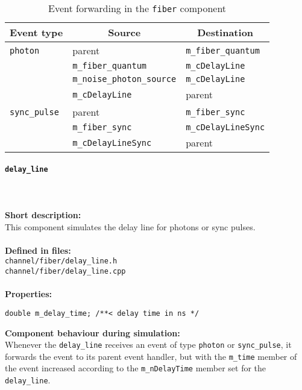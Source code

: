 \begin{table}[H]
\begin{tabular}{ | l | l || l | }
\hline
\multicolumn{1}{|c|}{\textbf{Event type}} & \multicolumn{1}{c||}{\textbf{Source}} & \multicolumn{1}{c|}{\textbf{Destination}} \\
\hline \hline
\texttt{photon} & parent & \texttt{m\_fiber\_quantum} \\
\cline{2-3}
 & \texttt{m\_fiber\_quantum} & \texttt{m\_cDelayLine} \\
\cline{2-3}
 & \texttt{m\_noise\_photon\_source} & \texttt{m\_cDelayLine} \\
\cline{2-3}
 & \texttt{m\_cDelayLine} & parent \\
\hline
\texttt{sync\_pulse} & parent & \texttt{m\_fiber\_sync} \\
\cline{2-3}
 & \texttt{m\_fiber\_sync} & \texttt{m\_cDelayLineSync} \\
\cline{2-3}
 & \texttt{m\_cDelayLineSync} & parent \\
\hline
\end{tabular}
\caption{Event forwarding in the \texttt{fiber} component}
\label{tab:comp_fiber_evfwd}
\end{table}

\paragraph{\texttt{delay\_line}}
\noindent \\
\\
\textbf{Short description:}\\
This component simulates the delay line for photons or sync pulses.\\
\\
\textbf{Defined in files:}\\
\texttt{channel/fiber/delay\_line.h}\\
\texttt{channel/fiber/delay\_line.cpp}\\
\\
\textbf{Properties:}\\
\begin{lstlisting}
double m_delay_time; /**< delay time in ns */
\end{lstlisting}
\noindent
\textbf{Component behaviour during simulation:}\\
Whenever the \texttt{delay\_line} receives an event of type \texttt{photon} or \texttt{sync\_pulse}, it forwards the event to its parent event handler, but with the \texttt{m\_time} member of the event increased according to the \texttt{m\_nDelayTime} member set for the \texttt{delay\_line}.

